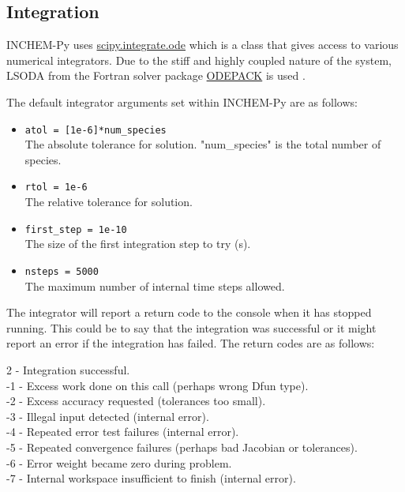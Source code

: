 \documentclass[a4paper]{refart}
\begin{document}
\subsection{Integration}\label{Integration}
INCHEM-Py uses \hyperlink{https://docs.scipy.org/doc/scipy/reference/generated/scipy.integrate.ode.html}{scipy.integrate.ode} which is a class that gives access to various numerical integrators. Due to the stiff and highly coupled nature of the system, LSODA from the Fortran solver package \hyperlink{http://www.netlib.org/odepack/}{ODEPACK} is used \cite{Hindmarsh1983}. 

The default integrator arguments set within INCHEM-Py are as follows:
\begin{itemize}
    \item \texttt{atol = [1e-6]*num\_species}\\
    The absolute tolerance for solution. "num\_species" is the total number of species.
    \item \texttt{rtol = 1e-6}\\
    The relative tolerance for solution.
    \item \texttt{first\_step = 1e-10}\\
    The size of the first integration step to try (s).
    \item \texttt{nsteps = 5000}\\
    The maximum number of internal time steps allowed.
\end{itemize}


The integrator will report a return code to the console when it has stopped running. This could be to say that the integration was successful or it might report an error if the integration has failed. The return codes are as follows:

2 - Integration successful.\\
-1 - Excess work done on this call (perhaps wrong Dfun type).\\
-2 - Excess accuracy requested (tolerances too small).\\
-3 - Illegal input detected (internal error).\\
-4 - Repeated error test failures (internal error).\\
-5 - Repeated convergence failures (perhaps bad Jacobian or tolerances).\\
-6 - Error weight became zero during problem.\\
-7 - Internal workspace insufficient to finish (internal error).
\end{document}
